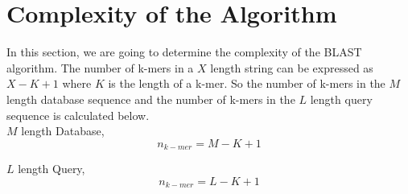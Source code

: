 \documentclass[12pt, a4paper]{report}
\begin{document}
\begin{figure}[h]
\begin{floatrow}
\end{floatrow}
\end{figure}

\section{Complexity of the Algorithm}
In this section, we are going to determine the complexity of the BLAST algorithm. The number of k-mers in a $X$ length string can be expressed as $X-K+1$ where $K$ is the length of a k-mer. So the number of k-mers in the $M$ length database sequence and the number of k-mers in the $L$ length query sequence is calculated below. \\ 

$M$ length Database, 
\begin{equation}
n_{k-mer} = M - K + 1
\end{equation}

$L$ length Query,
\begin{equation}
n_{k-mer} = L - K + 1
\end{equation}
\end{document}
